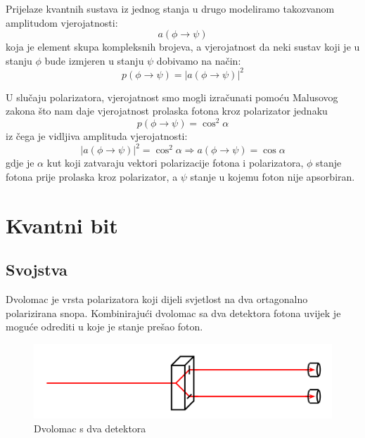 Prijelaze kvantnih sustava iz jednog stanja u drugo modeliramo takozvanom amplitudom vjerojatnosti:
\begin{equation}
a(\phi \rightarrow \psi)
\end{equation}
koja je element skupa kompleksnih brojeva, a vjerojatnost da neki sustav koji je u stanju $\phi$ bude izmjeren u stanju $\psi$ dobivamo na način:
\begin{equation}
p(\phi \rightarrow \psi) = |a(\phi \rightarrow \psi)|^2
\end{equation}

U slučaju polarizatora, vjerojatnost smo mogli izračunati pomoću Malusovog zakona što nam daje vjerojatnost prolaska fotona kroz polarizator jednaku
\begin{equation}
p(\phi \rightarrow \psi) = \cos^2 \alpha
\end{equation}
iz čega je vidljiva amplituda vjerojatnosti:
\begin{equation}
|a(\phi \rightarrow \psi)|^2 = \cos^2 \alpha \Rightarrow a(\phi \rightarrow \psi) = \cos \alpha
\end{equation}
gdje je $\alpha$ kut koji zatvaraju vektori polarizacije fotona i polarizatora, $\phi$ stanje fotona prije prolaska kroz polarizator, a $\psi$ stanje u kojemu foton nije apsorbiran.



\section{Kvantni bit}

\subsection{Svojstva}
Dvolomac je vrsta polarizatora koji dijeli svjetlost na dva ortagonalno polarizirana snopa. Kombinirajući dvolomac sa dva detektora fotona uvijek je moguće odrediti u koje je stanje prešao foton.
\begin{figure}[H]
\centering
\includegraphics[scale=0.5]{img/dvolomac_detektor.png}
\caption{Dvolomac s dva detektora} 
\end{figure}

